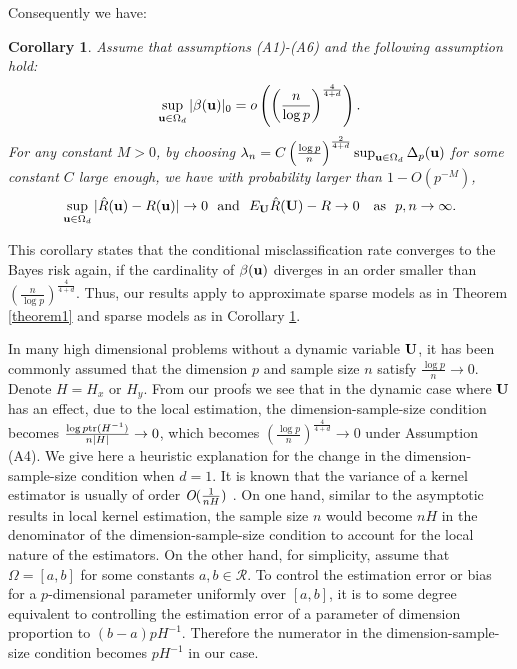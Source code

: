 \documentclass[11pt]{article}
\newtheorem{cor}{Corollary}
\theoremstyle{definition}
\begin{document}
 Consequently we have:
 \begin{cor}\label{cor} Assume that assumptions (A1)-(A6)
 	and the following assumption hold:
 	\begin{eqnarray}\label{assump}
 		\sup_{{\bf u}\in \Omega_d} |\beta({\bf u})|_0=o\left(\left(\frac{n}{\log p}\right)^{\frac{4}{4+d}} \right).
 	\end{eqnarray}
 	For any constant $M>0$, by choosing $\lambda_n=C\left(\frac{\log p}{n}\right)^{\frac{2}{4+d}}\sup_{{\bf u}\in \Omega_d}{\Delta_p({\bf u})}$ for some constant $C$
 	large enough, we have with probability larger than $1-{O}(p^{-M})$,
 	\begin{eqnarray*}
 		\sup_{{\bf u}\in \Omega_d}|\hat{R}({\bf u})-R({\bf u})|\rightarrow 0~~ {\rm and}~~ E_{\bf U}\hat{R}({\bf U})-R\rightarrow 0  ~~~{\rm as} ~~p, n\rightarrow \infty.
 	\end{eqnarray*}
 \end{cor}
 This corollary states that the conditional misclassification rate converges to the Bayes
 risk again, if the cardinality of $\beta({\bf u})$ diverges in an order
 smaller than $\left(\frac{n}{\log p}\right)^{\frac{4}{4+d}}$. Thus, our results apply to
 approximate sparse models as in Theorem \ref{theorem1} and sparse models as in
 Corollary \ref{cor}.
 
 In many high dimensional problems without  a dynamic variable ${\bf U}$,
 it has been commonly assumed that the dimension $p$ and sample size $n$
 satisfy $\frac{\log p}{n}\rightarrow 0$. Denote $H=H_x$ or
 $H_y$. From our proofs we see that in the dynamic case where ${\bf U}$ has an
 effect, due to the local estimation, the dimension-sample-size condition
 becomes $\frac{\log p{\rm tr}(H^{-1})}{n|H|}\rightarrow 0$, which becomes $\left(\frac{\log p}{n}\right)^{\frac{4}{4+d}}\rightarrow 0$ under Assumption (A4). We give here a heuristic
 explanation for the change in the dimension-sample-size condition when $d=1$. It is known
 that the variance of a kernel estimator is usually of order
 $\emph{O}(\frac{1}{nH})$ \citep{Fan1996}. On one hand, similar to the asymptotic
 results in local kernel estimation, the sample size $n$ would become $nH$ in
 the denominator of the dimension-sample-size condition to account for the
 local nature of the estimators. On the other hand, for simplicity, assume that
 $\Omega=[a,b]$ for some constants $a,b\in \mathcal{R}$. To control the
 estimation error or bias for a $p$-dimensional parameter uniformly over $[a,b]$, it is to some degree equivalent to controlling the estimation error of a parameter of dimension proportion to $(b-a)pH^{-1}$. Therefore the numerator in the  dimension-sample-size condition becomes $pH^{-1}$ in our case. %
 
\end{document}
